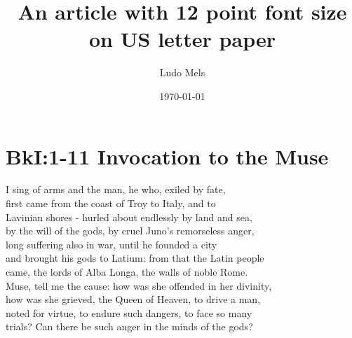\documentclass[12pt, letterpaper, titlepage]{article}
\title{An article with 12 point font size on US letter paper}
\author{Ludo Mels}
\date{\today}
\begin{document}
\maketitle
\newpage

\section*{BkI:1-11 Invocation to the Muse}
I sing of arms and the man, he who, exiled by fate,\\
first came from the coast of Troy to Italy, and to\\
Lavinian shores - hurled about endlessly by land and sea,\\
by the will of the gods, by cruel Juno's remorseless anger,\\
long suffering also in war, until he founded a city\\
and brought his gods to Latium: from that the Latin people\\
came, the lords of Alba Longa, the walls of noble Rome.\\
Muse, tell me the cause: how was she offended in her divinity,\\
how was she grieved, the Queen of Heaven, to drive a man,\\
noted for virtue, to endure such dangers, to face so many\\
trials? Can there be such anger in the minds of the gods?

\end{document}
